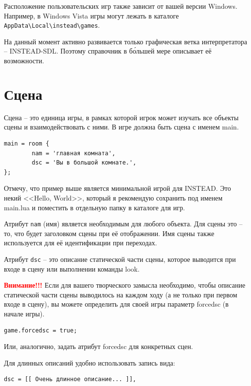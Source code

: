 \documentclass[12pt]{article}
\begin{document}
Расположение пользовательских игр также зависит от вашей версии Windows. Например, в Windows Vista игры могут лежать в каталоге \verb/AppData\Local\instead\games/.

На данный момент активно развивается только графическая ветка интерпретатора -- INSTEAD-SDL. Поэтому справочник в б\'{о}льшей мере описывает её возможности.

\section{Сцена}

Сцена -- это единица игры, в рамках которой игрок может изучать все объекты сцены и взаимодействовать с ними. В игре должна быть сцена с именем main.

\begin{verbatim}
main = room {
        nam = 'главная комната',
        dsc = 'Вы в большой комнате.',
};
\end{verbatim}

Отмечу, что пример выше является минимальной игрой для INSTEAD. Это некий <<Hello, World>>, который я рекомендую сохранить под именем main.lua и поместить в отдельную папку в каталоге для игр.


Атрибут \verb/nam/ (имя) является необходимым для любого объекта. Для сцены это -- то, что будет заголовком сцены при её отображении. Имя сцены также используется для её идентификации при переходах.

Атрибут \verb/dsc/ -- это описание статической части сцены, которое выводится при входе в сцену или выполнении команды look.

\textbf{\textcolor{red}{Внимание!!!}} Если для вашего творческого замысла необходимо, чтобы описание статической части сцены выводилось на каждом ходу (а не только при первом входе в сцену), вы можете определить для своей игры параметр forcedsc (в начале игры).

\begin{verbatim}
game.forcedsc = true;
\end{verbatim}

Или, аналогично, задать атрибут forcedsc для конкретных сцен.

\index{[[ ]]}
Для длинных описаний удобно использовать запись вида:

\begin{verbatim}
dsc = [[ Очень длинное описание... ]],
\end{verbatim}
\end{document}
